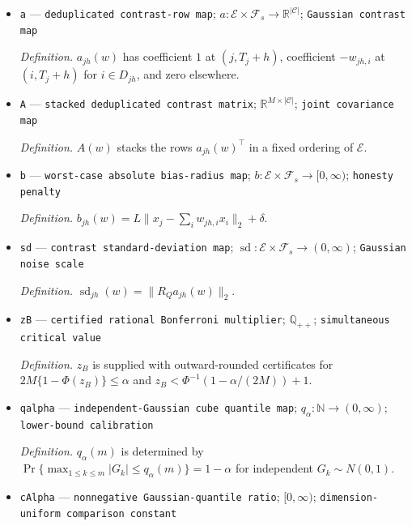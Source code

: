 \documentclass{article}
\begin{document}
\begin{itemize}
  \par\smallskip\noindent\emph{Definition.} \(\widehat\tau_{jh}(w)=Y^{\mathrm{obs}}_{j,T_j+h}-\sum_i w_{jh,i}Y^{\mathrm{obs}}_{i,T_j+h}\).
  \item \texttt{a} --- \texttt{deduplicated contrast-\allowbreak{}row map}; \(a:\mathcal E\times\mathcal F_s\to\mathbb R^{|\mathcal C|}\); \texttt{Gaussian contrast map}
  \par\smallskip\noindent\emph{Definition.} \(a_{jh}(w)\) has coefficient \(1\) at \((j,T_j+h)\), coefficient \(-w_{jh,i}\) at \((i,T_j+h)\) for \(i\in D_{jh}\), and zero elsewhere.
  \item \texttt{A} --- \texttt{stacked deduplicated contrast matrix}; \(\mathbb R^{M\times|\mathcal C|}\); \texttt{joint covariance map}
  \par\smallskip\noindent\emph{Definition.} \(A(w)\) stacks the rows \(a_{jh}(w)^{\top}\) in a fixed ordering of \(\mathcal E\).
  \item \texttt{b} --- \texttt{worst-\allowbreak{}case absolute bias-\allowbreak{}radius map}; \(b:\mathcal E\times\mathcal F_s\to[0,\infty)\); \texttt{honesty penalty}
  \par\smallskip\noindent\emph{Definition.} \(b_{jh}(w)=L\lVert x_j-\sum_iw_{jh,i}x_i\rVert_2+\delta\).
  \item \texttt{sd} --- \texttt{contrast standard-\allowbreak{}deviation map}; \(\operatorname{sd}:\mathcal E\times\mathcal F_s\to(0,\infty)\); \texttt{Gaussian noise scale}
  \par\smallskip\noindent\emph{Definition.} \(\operatorname{sd}_{jh}(w)=\lVert R_Qa_{jh}(w)\rVert_2\).
  \item \texttt{zB} --- \texttt{certified rational Bonferroni multiplier}; \(\mathbb Q_{++}\); \texttt{simultaneous critical value}
  \par\smallskip\noindent\emph{Definition.} \(z_B\) is supplied with outward-rounded certificates for \(2M\{1-\Phi(z_B)\}\le\alpha\) and \(z_B<\Phi^{-1}(1-\alpha/(2M))+1\).
  \item \texttt{qalpha} --- \texttt{independent-\allowbreak{}Gaussian cube quantile map}; \(q_\alpha:\mathbb N\to(0,\infty)\); \texttt{lower-\allowbreak{}bound calibration}
  \par\smallskip\noindent\emph{Definition.} \(q_\alpha(m)\) is determined by \(\Pr\{\max_{1\le k\le m}|G_k|\le q_\alpha(m)\}=1-\alpha\) for independent \(G_k\sim N(0,1)\).
  \item \texttt{cAlpha} --- \texttt{nonnegative Gaussian-\allowbreak{}quantile ratio}; \([0,\infty)\); \texttt{dimension-\allowbreak{}uniform comparison constant}

\end{itemize}
\end{document}
